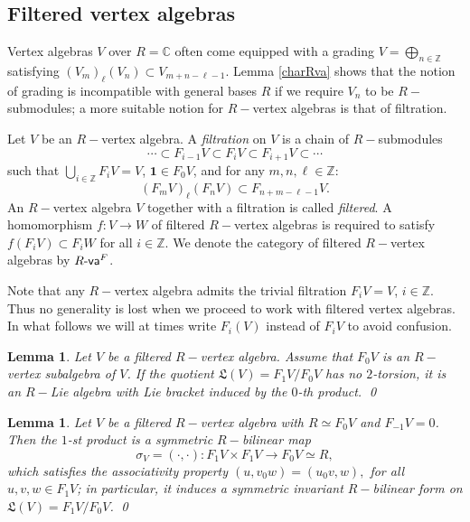 \documentclass{article}
\newtheorem{lem}[thm]{Lemma}
\theoremstyle{definition}
\def\Rfva{\ensuremath{R\text{-\textup{\textsf{va}}}}^F}
\begin{document}
\subsection{Filtered vertex algebras}

Vertex algebras $V$ over $R=\mathbb C$ often come equipped with a grading $V = \bigoplus_{n \in \mathbb Z}$ satisfying $(V_m)_\ell (V_n) \subset V_{m+n-\ell-1}$.
Lemma \ref{charRva} shows that the notion of grading is incompatible with general bases $R$ if we require $V_n$ to be $R-$submodules; a more suitable notion for $R-$vertex algebras is that of filtration.

Let $V$ be an $R-$vertex algebra.
	A \textit{filtration} on $V$ is a chain of $R-$submodules
	\[ \cdots \subset F_{i-1} V \subset F_i V \subset F_{i+1} V \subset \cdots \]
	such that $\bigcup_{i \in \mathbb Z} F_i V  = V$, $\mathbf 1 \in F_0 V$, and for any $m,n,\ell \in \mathbb Z$: 
    \[(F_m V)_\ell (F_n V) \subset F_{n+m-\ell-1} V. \]
An $R-$vertex algebra $V$ together with a filtration is called \textit{filtered}.
	A homomorphism $f \colon V \to W$ of filtered $R-$vertex algebras is required to satisfy $f(F_i V) \subset F_i W$ for all $i \in \mathbb Z$.
	We denote the category of filtered $R-$vertex algebras by $\Rfva$. 

	Note that any $R-$vertex algebra admits the trivial filtration $F_i V = V$, $i \in \mathbb Z$.
	Thus no generality is lost when we proceed to work with filtered vertex algebras. In what follows we will at times write  $F_i(V)$ instead of $F_iV$ to avoid confusion.
	     
\begin{lem}\label{Lie} 
    Let $V$ be a filtered $R-$vertex algebra.
	Assume that $F_0 V$ is an $R-$vertex subalgebra of $V$.  
    If  the quotient $\mathfrak L(V) = F_1 V / F_0 V$ has no $2$-torsion, it is an $R-$Lie algebra with Lie bracket induced by the $0$-th product. \qed \end{lem}

\begin{lem} \label{comm}
    Let $V$ be a filtered $R-$vertex algebra with $R \simeq F_0V$ and $F_{-1} V = 0$.
    Then the $1$-st product is a symmetric $R-$bilinear map 
			\[ \sigma_V = (\cdot, \cdot) \colon F_1 V \times F_1 V \to F_0 V \simeq R, \] 
			which satisfies the associativity property $ (u, v_0 w) = (u_0 v, w),$
    for all $u,v,w \in F_1 V$; in particular, it induces a symmetric invariant $R-$bilinear form on $\mathfrak L(V) = F_1 V / F_0 V$. \qed
\end{lem}
\end{document}
